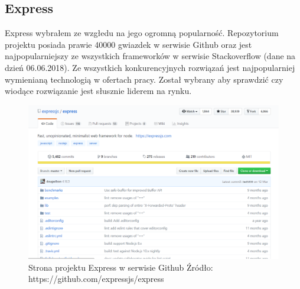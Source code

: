 \documentclass[12pt]{report}
\begin{document}
    \subsection{Express}
      Express wybrałem ze wzgłedu na jego ogromną popularność.
      Repozytorium projektu posiada prawie 40000 gwiazdek w serwisie Github oraz jest najpopularniejszy ze wszystkich frameworków w serwisie Stackoverflow (dane na dzień 06.06.2018).
      Ze wszystkich konkurencyjnych rozwiązań jest najpopularniej wymienianą technologią w ofertach pracy.
      Został wybrany aby sprawdzić czy wiodące rozwiązanie jest słusznie liderem na rynku.
      \begin{figure}[!hb]
        \centering
        \includegraphics[width=\textwidth,height=\textheight,keepaspectratio]{express.png} 
        \caption{Strona projektu Express w serwisie Github \newline Źródło: https://github.com/expressjs/express}
      \end{figure}
\end{document}
